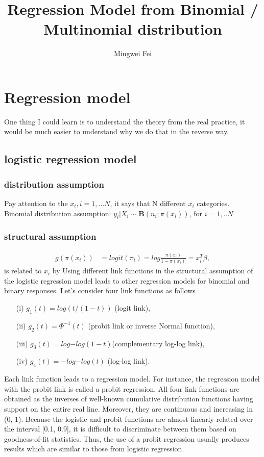 \documentclass{article}
\title{Regression Model from Binomial / Multinomial distribution}
\author{Mingwei Fei}
\begin{document}
	
	\maketitle
\section{Regression model}
One thing I could learn is to understand the theory from the real practice, it would be much easier to understand why we do that in the reverse way.

\subsection{logistic regression model}

\subsubsection {distribution assumption}
Pay attention to the $x_i, i=1, ...N$, it says that N different $x_i$ categories.\\
 Binomial distribution assumption: $y_i| X_i \sim \mathbf{B}\left(n_i; \pi(x_i) \right) $,     for $i=1,..N$
   \subsubsection {structural assumption} 
    \begin{align*}
   g(\pi(x_i)) &= logit(\pi_i) =  log \frac{\pi(x_i)}{1-\pi(x_i)} =x_i^T\beta, 
\end{align*}
is related to $x_i$ by 
Using different link functions in the structural assumption of the logistic regression model leads to other regression models for binomial and binary responses. Let’s consider four link functions as follows
\begin{itemize}
    \item [(i)] $g_1(t) = log(t/(1-t))$ (logit link), 
    \item [(ii)] $g_2(t) = \Phi^{-1}(t)$ (probit link or inverse Normal function),
    \item [(iii)] $g_3(t) =log{-log(1- t)} $(complementary log-log link),
    \item [(iv)] $g_4(t) = -log{-log(t)}$ (log-log link). 
\end{itemize}
Each link function leads to a regression model. For instance, the regression model with the probit link is called a probit regression. All four link functions are obtained as the inverses of well-known cumulative distribution functions having support on the entire real line. Moreover, they are continuous and increasing in (0, 1). Because the logistic and probit
functions are almost linearly related over the interval [0.1, 0.9], it is difficult to discriminate between them based on goodness-of-fit statistics. Thus, the use of a probit regression usually produces results which are similar to those from logistic regression.
\end{document}
